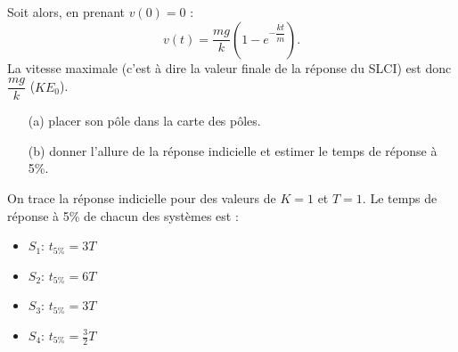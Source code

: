 Soit alors, en prenant $v(0)=0$ :
\[
v(t)=\dfrac{mg}{k}\left(1-e^{-\dfrac{kt}{m}}\right).
\]
La vitesse maximale (c'est à dire la valeur finale de la réponse du SLCI) 
est donc $\dfrac{mg}{k}$ ($KE_0$).
\begin{itemize}
    \item[(a)] placer son pôle dans la carte des pôles.
    \item[(b)] donner l'allure de la réponse indicielle et estimer le temps
               de réponse à 5\%.
\end{itemize}
\begin{center}
    
    
\end{center}
On trace la réponse indicielle pour des valeurs de $K=1$ et $T=1$.
Le temps de réponse à 5\% de chacun des systèmes est :
\begin{itemize}
    \item $S_1$: $t_{5\%}=3T$
    \item $S_2$: $t_{5\%}=6T$
    \item $S_3$: $t_{5\%}=3T$
    \item $S_4$: $t_{5\%}=\frac{3}{2}T$
\end{itemize}
